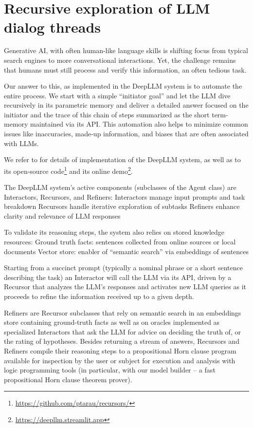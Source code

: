 \documentclass[submission,copyright,creativecommons]{eptcs}
\begin{document}
\section{Recursive exploration of LLM dialog threads}\label{rec}

Generative AI, with often human-like language skills is shifting focus from typical search engines to more conversational interactions. Yet, the challenge remains that humans must still process and verify this information, an often tedious task. 

Our answer to this, as implemented in the DeepLLM system
is to automate the entire process. We start with a simple ``initiator goal'' and let the LLM dive recursively in its parametric memory and deliver a detailed answer focused on the initiator and the trace of this chain of steps summarized as the short term-memory maintained via its API. This automation also helps to minimize common issues like inaccuracies, made-up information, and biases that are often associated with LLMs.

We refer to \cite{flops24,tarau2023automation} for details of implementation of the DeepLLM 
system, as well as to its open-source 
code\footnote{\url{https://github.com/ptarau/recursors/}} 
and its online demo\footnote{\url{https://deepllm.streamlit.app}}.

The DeepLLM system's active components (subclasses of the Agent class) are Interactors, Recursors, and Refiners:
\BI
\I Interactors manage input prompts and task breakdown
\I Recursors handle iterative exploration of subtasks
\I Refiners enhance clarity and relevance of LLM responses
\EI

To validate its reasoning steps, the system also relies on stored knowledge resources: 
\BI 
\I Ground truth facts: sentences collected from online sources or local documents
\I Vector store: enabler of ``semantic search'' via embeddings of sentences
\EI





Starting from a succinct prompt (typically a nominal phrase or a short sentence describing the task) an Interactor will call the LLM via its API, driven by a Recursor that analyzes the LLM's responses and activates new LLM queries  as it proceeds to refine the information received up to a given depth. 

Refiners are Recursor subclasses that rely on semantic search in an embeddings store containing ground-truth facts as well as on oracles implemented as specialized Interactors that ask the LLM for advice on deciding the truth of, or the rating of hypotheses. Besides returning a stream of answers, Recursors and Refiners compile their reasoning steps to a propositional Horn clause program available for inspection by the user or subject for execution and analysis with logic programming tools (in particular, with our model builder -- a fast propositional Horn clause theorem prover). 
\end{document}
